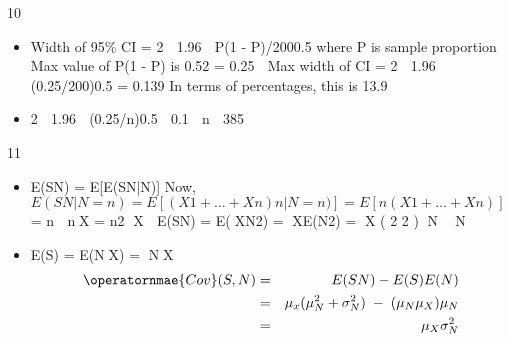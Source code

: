\documentclass[a4paper,12pt]{article}
\begin{document}
10  
\begin{itemize}
\item Width of 95\% CI = 2  1.96  {P(1 - P)/200}0.5 where P is sample
proportion
Max value of P(1 - P) is 0.52 = 0.25
 Max width of CI = 2  1.96  (0.25/200)0.5 = 0.139
In terms of percentages, this is 13.9%
\item 2  1.96  (0.25/n)0.5  0.1  n  385
\end{itemize}
11 
\begin{itemize}
\item E(SN) = E[E(SN|N)]
Now, $E(SN|N = n) = E[(X1 + \ldots+ Xn)n|N = n)] = E[n(X1 + \ldots+ Xn)]$
= n  nX = n2
X
 E(SN) = E(XN2) = XE(N2)
= X
( 2 2 ) N  N

\item E(S) = E(NX) = NX
\begin{eqnarray*}
\operatornmae{Cov}(S,N) &=& E(SN) - E(S)E(N)\\
&=& \mu_x (\mu^2_N + \sigma^2_N) \;-\; (\mu_N \mu_X)\mu_N \\
&=& \mu_X \sigma^2_N
\end{eqnarray*}

\end{itemize}
\end{document}
